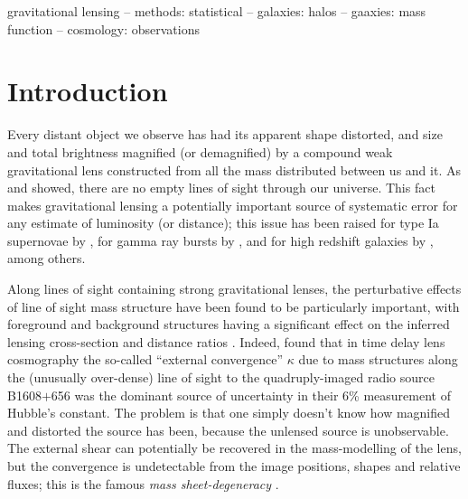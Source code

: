 \documentclass[useAMS,usenatbib]{mn2e}
\begin{document}
\begin{keywords}
  gravitational lensing   --
  methods: statistical    --
  galaxies: halos         --
  gaaxies: mass function  --
  cosmology: observations
\end{keywords}

\setcounter{footnote}{1}


\section{Introduction}
\label{sec:intro}

Every distant object we observe has had its apparent shape distorted,
and size and total brightness magnified (or demagnified) by a compound
weak gravitational lens constructed from all the mass distributed
between us and it. As \citet{Vale+White2003} and \citet{HilbertEtal2007}
showed, there are no empty lines of sight through our universe. This
fact makes gravitational lensing a potentially important source of
systematic error for any estimate of luminosity (or distance); this 
issue has been 
raised for \eg type Ia supernovae by
\citet[][]{Holz+Wald1998,Holz+Linder2005}, for gamma ray bursts by
\citet[][]{Oguri+Takahashi2006,Wang+Dai2011},  and for high redshift
galaxies by \citet{BradacEtal2009}, among others. 

Along lines of sight containing strong gravitational lenses, the
perturbative effects of line of sight mass structure have been found to
be particularly important, with foreground and background structures
having a significant effect on the inferred lensing cross-section
\citep[\eg][]{WongEtal2012} and distance ratios
\citep[][]{DalalEtal2005}. Indeed, \citet{SuyuEtal2010} found that in
time delay lens cosmography the so-called ``external convergence''
$\kappa$ due to mass structures along the (unusually over-dense) line
of sight to the quadruply-imaged radio source B1608$+$656 was the
dominant source of uncertainty in their 6\% measurement of Hubble's
constant. The problem is that one simply doesn't know how magnified and
distorted the source has been, because the unlensed source is
unobservable. The external shear can potentially be recovered in the
mass-modelling of the lens, but the convergence is undetectable from the
image positions, shapes and relative fluxes; this is the famous {\emph{ 
mass sheet-degeneracy}} \citep[see e.g.][for details]{FalcoEtal1985}.
\end{document}
